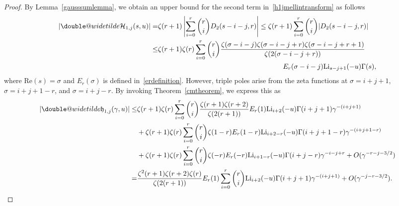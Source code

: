 \documentclass[12pt, oneside,reqno]{amsart}
\makeatletter
\numberwithin{equation}{section}
\newcommand{\doublewidetilde}[1]{{%
  \mathpalette\double@widetilde{#1}%
}}
\newcommand{\double@widetilde}[2]{%
  \sbox\z@{$\m@th#1\widetilde{#2}$}%
  \ht\z@=.9\ht\z@
  \widetilde{\box\z@}%
}
\makeatother
\begin{document}
\begin{proof}
\noindent
By Lemma~\ref{gausssumlemma}, we obtain an upper bound for the second term in~\eqref{h1jmellintransform} as follows
\begin{align*}
|\doublewidetilde{\mathcal{H}}_{1,j}(s,u)|
=&\zeta(r+1)\left|\sum_{i=0}^{r}\binom{r}{i}D_2(s-i-j,r)\right|
\leq\zeta(r+1)\sum_{i=0}^{r}\binom{r}{i}|D_2(s-i-j,r)|\\
\leq&\zeta(r+1)\zeta(r)\sum_{i=0}^{r}\binom{r}{i}\frac{\zeta(\sigma-i-j)\zeta(\sigma-i-j+r)\zeta(\sigma-i-j+r+1)}{\zeta(2(\sigma-i-j+r))}\\
&\quad\quad\quad\quad\quad\quad\quad\quad\quad\quad\quad\quad\quad\quad\quad\quad\quad\quad E_r(\sigma-i-j)\mathrm{Li}_{s-j+1}(-u)\Gamma(s),
\end{align*}
where $\mathrm{Re}(s)=\sigma$ and $E_r(\sigma)$ is defined in~\eqref{erdefinition}. However, triple poles arise from the zeta functions at $\sigma=i+j+1$, $\sigma=i+j+1-r$, and $\sigma=i+j-r$. By invoking Theorem~\ref{cmtheorem}, we express this as
\begin{align*}
|\doublewidetilde{\mathfrak{h}}_{1,j}(\gamma,u)|
\leq&\zeta(r+1)\zeta(r)\sum_{i=0}^{r}\binom{r}{i}\frac{\zeta(r+1)\zeta(r+2)}{\zeta(2(r+1))}E_r(1)\mathrm{Li}_{i+2}(-u)\Gamma(i+j+1)\gamma^{-(i+j+1)}\\
&+\zeta(r+1)\zeta(r)\sum_{i=0}^{r}\binom{r}{i}\zeta(1-r)E_r(1-r)\mathrm{Li}_{i+2-r}(-u)\Gamma(i+j+1-r)\gamma^{-(i+j+1-r)}\\
&+\zeta(r+1)\zeta(r)\sum_{i=0}^{r}\binom{r}{i}{\zeta(-r)E_r(-r)}\mathrm{Li}_{i+1-r}(-u)\Gamma(i+j-r)\gamma^{-i-j+r}+O(\gamma^{-r-j-3/2})\\
=&\frac{\zeta^2(r+1)\zeta(r+2)\zeta(r)}{\zeta(2(r+1))}E_r(1)\sum_{i=0}^{r}\binom{r}{i}\mathrm{Li}_{i+2}(-u)\Gamma(i+j+1)\gamma^{-(i+j+1)}+O(\gamma^{-j-r-3/2}).
\end{align*}


\end{proof}
\end{document}
